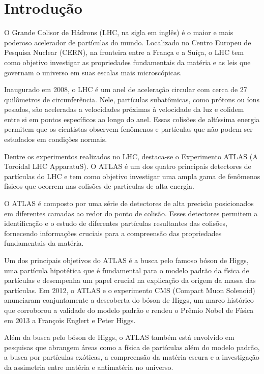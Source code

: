 \section{Introdução}\label{cap:intro}

O Grande Colisor de Hádrons (LHC, na sigla em inglês) é o maior e mais poderoso acelerador de partículas do mundo. Localizado no Centro Europeu de Pesquisa Nuclear (CERN), na fronteira entre a França e a Suíça, o LHC tem como objetivo investigar as propriedades fundamentais da matéria e as leis que governam o universo em suas escalas mais microscópicas.

Inaugurado em 2008, o LHC é um anel de aceleração circular com cerca de 27 quilômetros de circunferência. Nele, partículas subatômicas, como prótons ou íons pesados, são aceleradas a velocidades próximas à velocidade da luz e colidem entre si em pontos específicos ao longo do anel. Essas colisões de altíssima energia permitem que os cientistas observem fenômenos e partículas que não podem ser estudados em condições normais.

Dentre os experimentos realizados no LHC, destaca-se o Experimento ATLAS (A Toroidal LHC ApparatuS). O ATLAS é um dos quatro principais detectores de partículas do LHC e tem como objetivo investigar uma ampla gama de fenômenos físicos que ocorrem nas colisões de partículas de alta energia.

O ATLAS é composto por uma série de detectores de alta precisão posicionados em diferentes camadas ao redor do ponto de colisão. Esses detectores permitem a identificação e o estudo de diferentes partículas resultantes das colisões, fornecendo informações cruciais para a compreensão das propriedades fundamentais da matéria.

Um dos principais objetivos do ATLAS é a busca pelo famoso bóson de Higgs, uma partícula hipotética que é fundamental para o modelo padrão da física de partículas e desempenha um papel crucial na explicação da origem da massa das partículas. Em 2012, o ATLAS e o experimento CMS (Compact Muon Solenoid) anunciaram conjuntamente a descoberta do bóson de Higgs, um marco histórico que corroborou a validade do modelo padrão e rendeu o Prêmio Nobel de Física em 2013 a François Englert e Peter Higgs.

Além da busca pelo bóson de Higgs, o ATLAS também está envolvido em pesquisas que abrangem áreas como a física de partículas além do modelo padrão, a busca por partículas exóticas, a compreensão da matéria escura e a investigação da assimetria entre matéria e antimatéria no universo.

